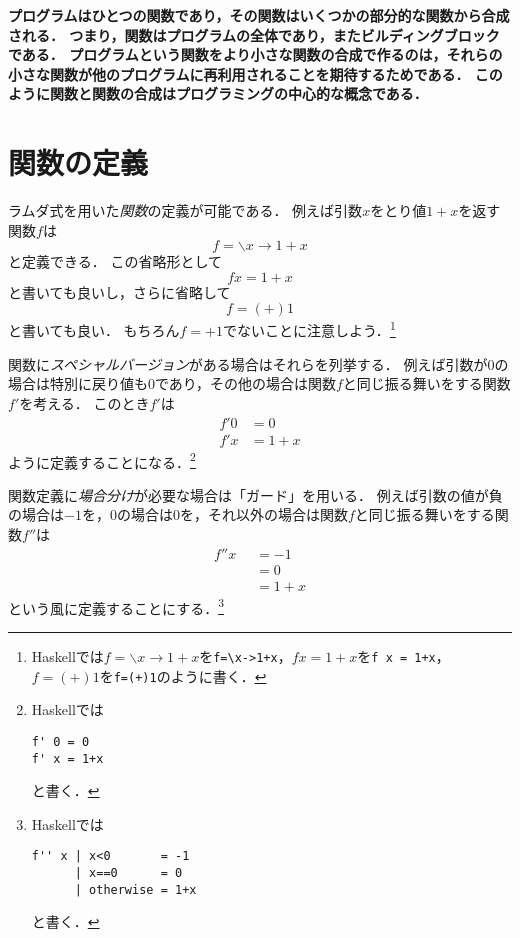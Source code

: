\documentclass[twocolumn]{jsbook}
\newcommand{\keyword}[1]{\emph{#1}}
\newcommand{\code}[1]{\texttt{#1}}
\newenvironment{leader}{\begingroup\bf}{\endgroup}
\newcommand{\lambdasym}{\backslash}
\newcommand{\lambdadot}{\rightarrow}
\newcommand{\lambdaexp}[2]{\lambdasym#1\lambdadot#2}
\newcommand{\binaryeq}{\equiv}
\newcommand{\binaryl}{<}
\newcommand{\guard}[1]{\mathop{\mid_{#1}}}
\newcommand{\keywordname}[1]{\mathbf{#1}}
\newcommand{\keywordotherwise}{\keywordname{otherwise}}
\begin{document}
\begin{leader}
プログラムはひとつの関数であり，その関数はいくつかの部分的な関数から合成される．
つまり，関数はプログラムの全体であり，またビルディングブロックである．
プログラムという関数をより小さな関数の合成で作るのは，それらの小さな関数が他のプログラムに再利用されることを期待するためである．
このように関数と関数の合成はプログラミングの中心的な概念である．
\end{leader}


\section{関数の定義}

ラムダ式を用いた\keyword{関数}の定義が可能である．
例えば引数$x$をとり値$1+x$を返す関数$f$は$$f=\lambdaexp{x}{1+x}$$と定義できる．
この省略形として$$fx=1+x$$と書いても良いし，さらに省略して$$f=(+)1$$と書いても良い．
もちろん$f=+1$でないことに注意しよう．\footnote{Haskellでは$f=\lambdaexp{x}{1+x}$を\code{f=\textbackslash x->1+x}，$fx=1+x$を\code{f x = 1+x}，$f=(+)1$を\code{f=(+)1}のように書く．}

関数に\keyword{スペシャルバージョン}がある場合はそれらを列挙する．
例えば引数が$0$の場合は特別に戻り値も$0$であり，その他の場合は関数$f$と同じ振る舞いをする関数$f'$を考える．
このとき$f'$は
\begin{equation*}
\begin{split}
f'0&=0\\
f'x&=1+x
\end{split}
\end{equation*}
ように定義することになる．\footnote{Haskellでは
\begin{verbatim}
f' 0 = 0
f' x = 1+x
\end{verbatim}
と書く．}

関数定義に\keyword{場合分け}が必要な場合は「ガード」を用いる．
例えば引数の値が負の場合は$-1$を，$0$の場合は$0$を，それ以外の場合は関数$f$と同じ振る舞いをする関数$f''$は
\begin{equation*}
\begin{split}
f''x&\guard{x\binaryl0}=-1\\
&\guard{x\binaryeq0}=0\\
&\guard{\keywordotherwise}=1+x
\end{split}
\end{equation*}
という風に定義することにする．\footnote{Haskellでは
\begin{verbatim}
f'' x | x<0       = -1
      | x==0      = 0
      | otherwise = 1+x
\end{verbatim}
と書く．}
\end{document}
